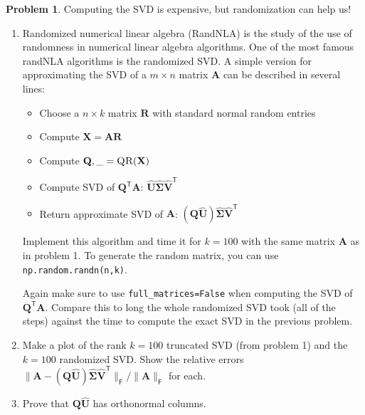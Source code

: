 \documentclass[12pt]{article}
\theoremstyle{definition}
\newtheorem{problem}{Problem}
\renewcommand{\vec}{\mathbf}
\newcommand{\T}{\mathsf{T}}
\newcommand{\F}{\mathsf{F}}
\begin{document}
\begin{problem}
    Computing the SVD is expensive, but randomization can help us!
    \begin{enumerate}
        \item Randomized numerical linear algebra (RandNLA) is the study of the use of randomness in numerical linear algebra algorithms. 
            One of the most famous randNLA algorithms is the randomized SVD.
            A simple version for approximating the SVD of a $m\times n$ matrix $\vec{A}$ can be described in several lines:
            \begin{itemize}
                \item Choose a $n\times k$ matrix $\vec{R}$ with standard normal random entries
                \item Compute $\vec{X} = \vec{A} \vec{R}$
                \item Compute $\vec{Q},\_ = \textsc{QR}(\vec{X})$
                \item Compute SVD of $\vec{Q}^\T \vec{A}$: $\hat{\vec{U}} \hat{\vec{\Sigma}} \hat{\vec{V}}^\T$
                \item Return approximate SVD of $\vec{A}$: $(\vec{Q} \hat{\vec{U}}) \hat{\vec{\Sigma}} \hat{\vec{V}}^\T$  
            \end{itemize}

            Implement this algorithm and time it for $k=100$ with the same matrix $\vec{A}$ as in problem 1.
            To generate the random matrix, you can use \lstinline{np.random.randn(n,k)}.


            Again make sure to use \lstinline{full_matrices=False} when computing the SVD of $\vec{Q}^\T \vec{A}$.
            Compare this to long the whole randomized SVD took (all of the steps) against the time to compute the exact SVD in the previous problem.
        
        \item 
            Make a plot of the rank $k=100$ truncated SVD (from problem 1) and the $k=100$ randomized SVD.
            Show the relative errors $\|\vec{A} - (\vec{Q} \hat{\vec{U}})\hat{\vec{\Sigma}} \hat{\vec{V}}^\T \|_\F/\|\vec{A}\|_\F$ for each. 

        \item Prove that $\vec{Q}\hat{\vec{U}}$ has orthonormal columns.
    \end{enumerate}
\end{problem}
\end{document}
